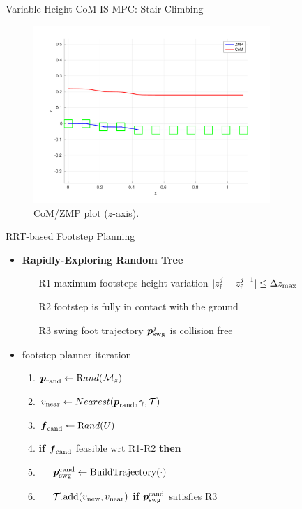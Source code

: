 \documentclass[10pt]{beamer}
\begin{document}
\begin{frame}{Variable Height CoM IS-MPC: Stair Climbing}	
	\begin{figure}
		\centering
		\includegraphics[width=0.8\textwidth]
				{figures/experiments/multiple-staircases/downstairs/xz-plot-2cm.pdf}
		\caption{CoM/ZMP plot ($z$-axis).}
	\end{figure}
\end{frame}

\begin{frame}{RRT-based Footstep Planning}
  \begin{itemize}
    \item \textbf{Rapidly-Exploring Random Tree}
			\begin{itemize}
        \item[R1] maximum footsteps height variation
				    $|z_{\rm f}^j - z_{\rm f}^{j-1}| \le \Delta z_{\max}$
        \item[R2] footstep is fully in contact with the ground
        \item[R3] swing foot trajectory ${\mbox{\boldmath $p$}}_{\rm {swg}}^j$ is collision free
			\end{itemize}
    \item footstep planner iteration
			\begin{enumerate}
        \item ${\mbox{\boldmath $p$}}_{\rm rand} \leftarrow {\text Rand}(\mathcal{M}_z)$
				\item $v_{\rm near} \leftarrow Nearest({\mbox{\boldmath $p$}}_{\rm rand}, \gamma,
            \mathcal{T})$
        \item ${\mbox{\boldmath $f$}}_{\rm cand} \leftarrow {\text Rand}(U)$
				\item \textbf{if} ${\mbox{\boldmath $f$}}_{\rm cand}$ feasible wrt R1-R2 \textbf{then}
				\item $\quad$ ${\mbox{\boldmath $p$}}_{\rm swg}^{\rm cand}
						\leftarrow \text{BuildTrajectory}(\cdot)$
				\item $\quad$ $\mathcal{T}\text{.add}(v_{\rm new}, v_{\rm near})$
						\textbf{if} ${\mbox{\boldmath $p$}}_{\rm swg}^{\rm cand}$ satisfies R3
      \end{enumerate}
	\end{itemize}
\end{frame}
\end{document}
